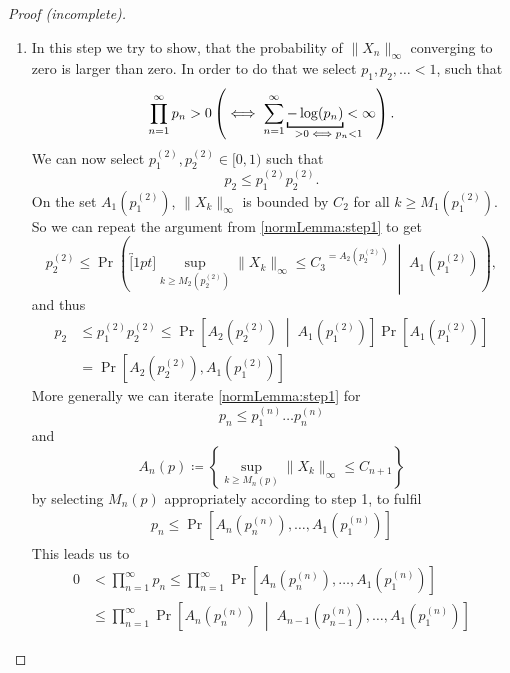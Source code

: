 \begin{proof}[Proof (incomplete)]
\begin{enumerate}[label= Step \arabic*:, ref= Step \arabic*, leftmargin=0pt]
\begin{align*}
        \le \lim_{n\to\infty} \sum_{x\in\cX} \Pr\left(\sup_{k\ge n}|X_k(x)| > C_2  \right)=0,
    \end{align*}
    we can select \(M_1(p_1)\in\N\) such that the probability of
    \[
        A_1(p_1)\coloneqq  \left\{\sup_{k\ge M_1(p_1)} \|X_k\|_\infty \le C_2\right\}
    \]
    is larger than \(p_1\in[0,1)\).
    \item\label{normLemma:step2} In this step we try to show, that the probability of \(\|X_n\|_\infty\) converging to zero is larger than zero. In order to do that we select \(p_1,p_2,\dots <1\), such that
    \[
        \prod_{n=1}^\infty p_n >0 \left(\iff \sum_{n=1}^\infty \underbracket[1pt]{-\log(p_n)}_{>0 \iff \mathrlap{p_n <1}}< \infty \right).
    \]
    We can now select \(p_1^{(2)},p_2^{(2)}\in[0,1)\) such that 
    \[
        p_2\le p_1^{(2)}p_2^{(2)}.    
    \]
    On the set \(A_1\left(p_1^{(2)}\right)\), \(\|X_k\|_\infty\) is bounded by \(C_2\) for all \(k\ge M_1\left(p_1^{(2)}\right)\). So we can repeat the argument from \ref{normLemma:step1} to get
    \[
        p_2^{(2)}\le \Pr\left(\overbracket[1pt]{\sup_{k\ge M_2\left(p_2^{(2)} \right)}\|X_k\|_\infty \le C_3}^{
            =A_2\left( p_2^{(2)}\right)
        } \;\middle|\; A_1\left(p_1^{(2)} \right)\right),
    \]
    and thus
    \begin{align*}
        p_2
        &\le p_1^{(2)}p_2^{(2)} 
        \le \Pr\left[A_2\left( p_2^{(2)}\right)
        \;\middle|\; A_1\left(p_1^{(2)} \right)\right] \Pr\left[A_1\left(p_1^{(2)}\right)\right]\\
        &=\Pr\left[A_2\left( p_2^{(2)}\right), A_1\left(p_1^{(2)} \right)\right]
    \end{align*}
    More generally we can iterate \ref{normLemma:step1} for 
    \[
       p_n\le p_1^{(n)}\dots p_n^{(n)} 
    \]
    and
    \[
        A_n(p)\coloneqq \left\{\sup_{k\ge M_n(p)}\|X_k\|_\infty \le C_{n+1} \right\}
    \]
    by selecting \(M_n(p)\) appropriately according to step 1, to fulfil
    \begin{align}\label{vep_0 inequality}
        p_n\le \Pr\left[ A_n\left( p_n^{(n)}\right),\dots, A_1\left(p_1^{(n)} \right)\right]
    \end{align}
    This leads us to
    \begin{align}
        0&<\prod_{n=1}^\infty p_n 
        \le \prod_{n=1}^\infty\Pr\left[ A_n\left( p_n^{(n)}\right),\dots, A_1\left(p_1^{(n)} \right)\right]
        \nonumber\\
        &\le \prod_{n=1}^\infty\Pr\left[ A_n\left( p_n^{(n)}\right)\;\middle|\; A_{n-1}\left( p_{n-1}^{(n)}\right),\dots, A_1\left(p_1^{(n)} \right)\right]

\end{align}
\end{enumerate}
\end{proof}
